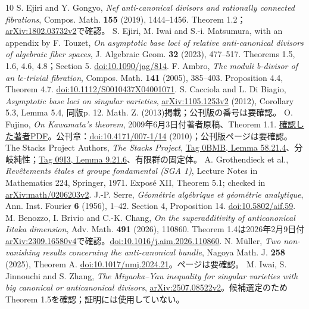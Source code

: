 \documentclass[12pt]{amsart}
\theoremstyle{definition}
\theoremstyle{remark}
\numberwithin{equation}{section}
\begin{document}
\begin{thebibliography}{10}
 S. Ejiri and Y. Gongyo, \emph{Nef anti-canonical divisors and rationally connected fibrations}, Compos. Math. \textbf{155} (2019), 1444--1456. Theorem 1.2；\href{https://arxiv.org/abs/1802.03732v2}{arXiv:1802.03732v2}で確認。
 S. Ejiri, M. Iwai and S.-i. Matsumura, with an appendix by F. Touzet, \emph{On asymptotic base loci of relative anti-canonical divisors of algebraic fiber spaces}, J. Algebraic Geom. \textbf{32} (2023), 477--517. Theorems 1.5, 1.6, 4.6, 4.8；Section 5. \href{https://doi.org/10.1090/jag/814}{doi:10.1090/jag/814}.
 F. Ambro, \emph{The moduli b-divisor of an lc-trivial fibration}, Compos. Math. \textbf{141} (2005), 385--403. Proposition 4.4, Theorem 4.7. \href{https://doi.org/10.1112/S0010437X04001071}{doi:10.1112/S0010437X04001071}.
 S. Cacciola and L. Di Biagio, \emph{Asymptotic base loci on singular varieties}, \href{https://arxiv.org/abs/1105.1253v2}{arXiv:1105.1253v2} (2012), Corollary 5.3, Lemma 5.4, 同版p. 12. Math. Z. (2013)掲載；公刊版の番号は要確認。
 O. Fujino, \emph{On Kawamata's theorem}, 2009年6月3日付著者原稿、Theorem 1.1. \href{https://www.math.kyoto-u.ac.jp/~fujino/kawamata10.pdf}{確認した著者PDF}。公刊章：\href{https://doi.org/10.4171/007-1/14}{doi:10.4171/007-1/14} (2010)；公刊版ページは要確認。
 The Stacks Project Authors, \emph{The Stacks Project}, \href{https://stacks.math.columbia.edu/tag/0BMB}{Tag 0BMB, Lemma 58.21.4}、分岐純性；\href{https://stacks.math.columbia.edu/tag/09I3}{Tag 09I3, Lemma 9.21.6}、有限群の固定体。
 A. Grothendieck et al., \emph{Rev\^etements \'etales et groupe fondamental (SGA 1)}, Lecture Notes in Mathematics 224, Springer, 1971. Expos\'e XII, Theorem 5.1; checked in \href{https://arxiv.org/abs/math/0206203v2}{arXiv:math/0206203v2}.
 J.-P. Serre, \emph{G\'eom\'etrie alg\'ebrique et g\'eom\'etrie analytique}, Ann. Inst. Fourier \textbf{6} (1956), 1--42. Section 4, Proposition 14. \href{https://doi.org/10.5802/aif.59}{doi:10.5802/aif.59}.
 M. Benozzo, I. Brivio and C.-K. Chang, \emph{On the superadditivity of anticanonical Iitaka dimension}, Adv. Math. \textbf{491} (2026), 110860. Theorem 1.4は2026年2月9日付\href{https://arxiv.org/abs/2309.16580v4}{arXiv:2309.16580v4}で確認。\href{https://doi.org/10.1016/j.aim.2026.110860}{doi:10.1016/j.aim.2026.110860}.
 N. M\"uller, \emph{Two non-vanishing results concerning the anti-canonical bundle}, Nagoya Math. J. \textbf{258} (2025), Theorem A. \href{https://doi.org/10.1017/nmj.2024.21}{doi:10.1017/nmj.2024.21}。ページは要確認。
 M. Iwai, S. Jinnouchi and S. Zhang, \emph{The Miyaoka--Yau inequality for singular varieties with big canonical or anticanonical divisors}, \href{https://arxiv.org/html/2507.08522v2}{arXiv:2507.08522v2}。候補選定のためTheorem 1.5を確認；証明には使用していない。
\end{thebibliography}
\end{document}
